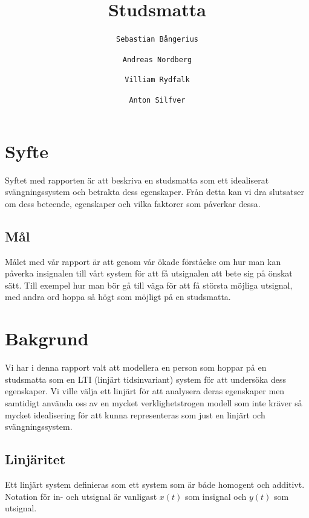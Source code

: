 \documentclass[10pt,a4paper]{article}
\author{
  \texttt{Sebastian Bångerius}
  \and
  \texttt{Andreas Nordberg}
  \and
  \texttt{Villiam Rydfalk}
  \and
  \texttt{Anton Silfver}
}
\begin{document}

\title{Studsmatta}
\maketitle

\cleardoublepage

\tableofcontents

\clearpage

\section{Syfte}
\setcounter{page}{3}

Syftet med rapporten är att beskriva en studsmatta som ett idealiserat svängningssystem och betrakta dess egenskaper. Från detta kan vi dra slutsatser om dess beteende, egenskaper och vilka faktorer som påverkar dessa.

\subsection{Mål}
Målet med vår rapport är att genom vår ökade förståelse om hur man kan påverka insignalen till vårt system för att få utsignalen att bete sig på önskat sätt. Till exempel hur man bör gå till väga för att få största möjliga utsignal, med andra ord hoppa så högt som möjligt på en studsmatta.



\section{Bakgrund}

Vi har i denna rapport valt att modellera en person som hoppar på en studsmatta som en LTI (linjärt tidsinvariant) system för att undersöka dess egenskaper. Vi ville välja ett linjärt för att analysera deras egenskaper men samtidigt använda oss av en mycket verklighetstrogen modell som inte kräver så mycket idealisering för att kunna representeras som just en linjärt och svängningssystem.

\subsection{Linjäritet}

Ett linjärt system definieras som ett system som är både homogent och additivt. Notation för in- och utsignal är vanligast $x(t)$ som insignal och $y(t)$ som utsignal.
\end{document}
